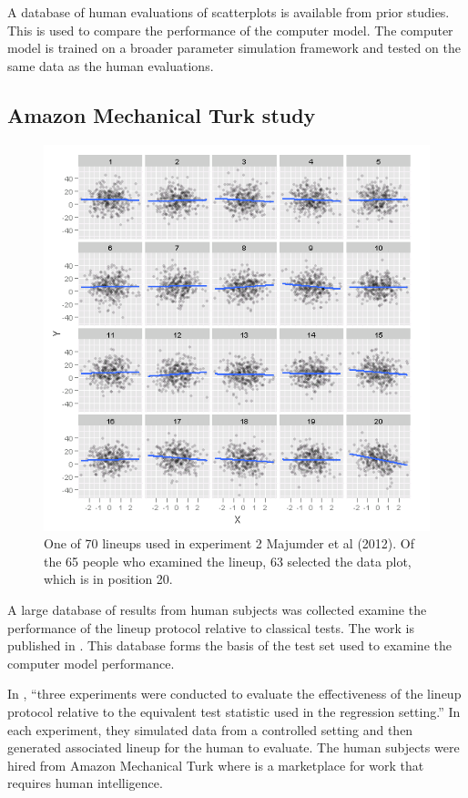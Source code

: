 \documentclass[12pt]{article}
\begin{document}
A database of human evaluations of scatterplots is available from prior
studies. This is used to compare the performance of the computer model.
The computer model is trained on a broader parameter simulation
framework and tested on the same data as the human evaluations.

\subsection{Amazon Mechanical Turk
study}\label{amazon-mechanical-turk-study}

\begin{figure}[h]
\centerline{\includegraphics[width=15cm]{figures/plot_turk2_300_350_12_3.png}}
\caption{One of 70 lineups used in experiment 2 Majumder et al (2012). Of the 65 people who examined the lineup,  63 selected the data plot, which is in position 20.}
\label{expt2}
\end{figure}

A large database of results from human subjects was collected examine
the performance of the lineup protocol relative to classical tests. The
work is published in \citet{MM13}. This database forms the basis of the
test set used to examine the computer model performance.

In \citet{MM13}, ``three experiments were conducted to evaluate the
effectiveness of the lineup protocol relative to the equivalent test
statistic used in the regression setting.'' In each experiment, they
simulated data from a controlled setting and then generated associated
lineup for the human to evaluate. The human subjects were hired from
Amazon Mechanical Turk where is a marketplace for work that requires
human intelligence. \citep{amazon}
\end{document}
